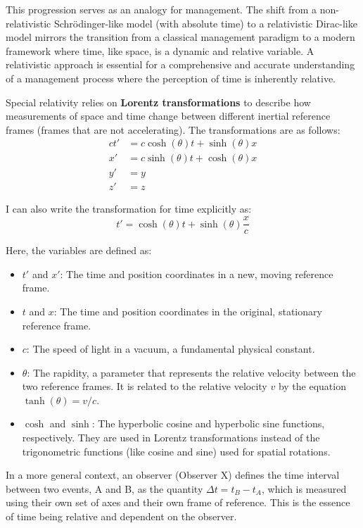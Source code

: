 \documentclass{article}
\begin{document}
 This progression serves as an analogy for management. The shift from a non-relativistic Schrödinger-like model (with absolute time) to a relativistic Dirac-like model mirrors the transition from a classical management paradigm to a modern framework where time, like space, is a dynamic and relative variable. A relativistic approach is essential for a comprehensive and accurate understanding of a management process where the perception of time is inherently relative.
 
 
 
 Special relativity relies on \textbf{Lorentz transformations} to describe how measurements of space and time change between different inertial reference frames (frames that are not accelerating). The transformations are as follows:
 \begin{align*}
 ct' &= c \cosh(\theta) t + \sinh(\theta) x \\
 x' &= c \sinh(\theta) t + \cosh(\theta) x \\
 y' &= y \\
 z' &= z
 \end{align*}
 
 I can also write the transformation for time explicitly as:
 $$ t' = \cosh(\theta) t + \sinh(\theta) \frac{x}{c} $$
 
 Here, the variables are defined as:
 \begin{itemize}
 	\item $t'$ and $x'$: The time and position coordinates in a new, moving reference frame.
 	\item $t$ and $x$: The time and position coordinates in the original, stationary reference frame.
 	\item $c$: The speed of light in a vacuum, a fundamental physical constant.
 	\item $\theta$: The rapidity, a parameter that represents the relative velocity between the two reference frames. It is related to the relative velocity $v$ by the equation $\tanh(\theta) = v/c$.
 	\item $\cosh$ and $\sinh$: The hyperbolic cosine and hyperbolic sine functions, respectively. They are used in Lorentz transformations instead of the trigonometric functions (like cosine and sine) used for spatial rotations.
 \end{itemize}
 
 In a more general context, an observer (Observer X) defines the time interval between two events, A and B, as the quantity $\Delta t = t_B - t_A$, which is measured using their own set of axes and their own frame of reference. This is the essence of time being relative and dependent on the observer.
\end{document}
